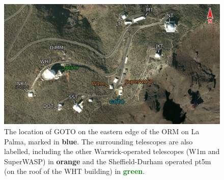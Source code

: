 \begin{colsection}
\begin{colsection}
\begin{figure}[p]
    \begin{center}
        \includegraphics[width=\linewidth]{images/orm_east_labelled.png}
    \end{center}
    \caption[The location of GOTO on La Palma]{
        The location of GOTO on the eastern edge of the ORM on La Palma, marked in \textcolor{BlueGreen}{\textbf{blue}}. The surrounding telescopes are also labelled, including the other Warwick-operated telescopes (W1m and SuperWASP) in \textcolor{BurntOrange}{\textbf{orange}} and the Sheffield-Durham operated pt5m (on the roof of the WHT building) in \textcolor{Green}{\textbf{green}}.
    }\label{fig:orm_east}
\end{figure}

\clearpage

\end{colsection}


\end{colsection}

